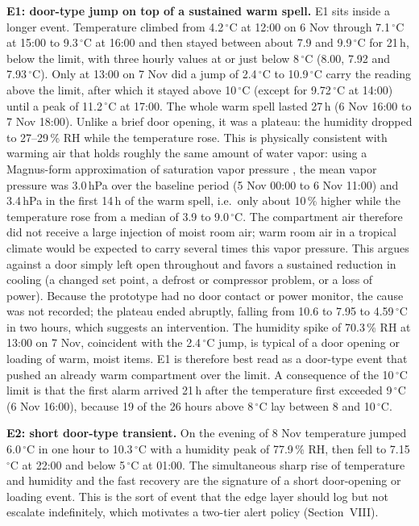 \documentclass[conference]{IEEEtran}
\newcommand{\degC}{\ensuremath{^{\circ}}C}
\begin{document}
\textbf{E1: door-type jump on top of a sustained warm spell.} E1 sits inside a longer event. Temperature climbed from 4.2\,\degC{} at 12:00 on 6 Nov through 7.1\,\degC{} at 15:00 to 9.3\,\degC{} at 16:00 and then stayed between about 7.9 and 9.9\,\degC{} for 21\,h, below the limit, with three hourly values at or just below 8\,\degC{} (8.00, 7.92 and 7.93\,\degC). Only at 13:00 on 7 Nov did a jump of 2.4\,\degC{} to 10.9\,\degC{} carry the reading above the limit, after which it stayed above 10\,\degC{} (except for 9.72\,\degC{} at 14:00) until a peak of 11.2\,\degC{} at 17:00. The whole warm spell lasted 27\,h (6 Nov 16:00 to 7 Nov 18:00). Unlike a brief door opening, it was a plateau: the humidity dropped to 27--29\,\% RH while the temperature rose. This is physically consistent with warming air that holds roughly the same amount of water vapor: using a Magnus-form approximation of saturation vapor pressure \cite{magnus}, the mean vapor pressure was 3.0\,hPa over the baseline period (5 Nov 00:00 to 6 Nov 11:00) and 3.4\,hPa in the first 14\,h of the warm spell, i.e.\ only about 10\,\% higher while the temperature rose from a median of 3.9 to 9.0\,\degC. The compartment air therefore did not receive a large injection of moist room air; warm room air in a tropical climate would be expected to carry several times this vapor pressure. This argues against a door simply left open throughout and favors a sustained reduction in cooling (a changed set point, a defrost or compressor problem, or a loss of power). Because the prototype had no door contact or power monitor, the cause was not recorded; the plateau ended abruptly, falling from 10.6 to 7.95 to 4.59\,\degC{} in two hours, which suggests an intervention. The humidity spike of 70.3\,\% RH at 13:00 on 7 Nov, coincident with the 2.4\,\degC{} jump, is typical of a door opening or loading of warm, moist items. E1 is therefore best read as a door-type event that pushed an already warm compartment over the limit. A consequence of the 10\,\degC{} limit is that the first alarm arrived 21\,h after the temperature first exceeded 9\,\degC{} (6 Nov 16:00), because 19 of the 26 hours above 8\,\degC{} lay between 8 and 10\,\degC.

\textbf{E2: short door-type transient.} On the evening of 8 Nov temperature jumped 6.0\,\degC{} in one hour to 10.3\,\degC{} with a humidity peak of 77.9\,\% RH, then fell to 7.15\,\degC{} at 22:00 and below 5\,\degC{} at 01:00. The simultaneous sharp rise of temperature and humidity and the fast recovery are the signature of a short door-opening or loading event. This is the sort of event that the edge layer should log but not escalate indefinitely, which motivates a two-tier alert policy (Section~VIII).
\end{document}
